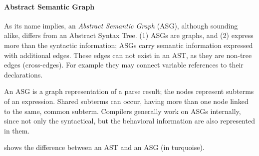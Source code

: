 \paragraph{Abstract Semantic Graph}
As its name implies, an \emph{Abstract Semantic Graph} (ASG), although sounding alike, differs from an Abstract Syntax Tree. (1) ASGs are graphs, and (2) express more than the syntactic information; ASGs carry semantic information expressed with additional edges. These edges can not exist in an AST, as they are non-tree edges (cross-edges). For example they may connect variable references to their declarations.~\cite{raghavan_dex:_2004}

An ASG is a graph representation of a parse result; the nodes represent subterms of an expression. Shared subterms can occur, having more than one node linked to the same, common subterm. Compilers generally work on ASGs internally, since not only the syntactical, but the behavioral information are also represented in them.


 shows the difference between an AST and an ASG (in turquoise).


